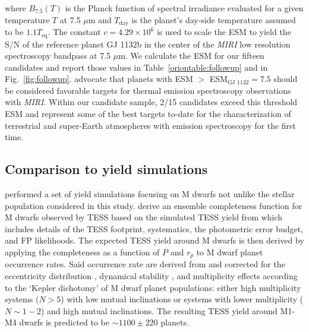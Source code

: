 \noindent where $B_{7.5}(T)$ is the Planck function of spectral irradiance evaluated for a given temperature
$T$ at 7.5 $\mu$m and $T_{\text{day}}$ is the planet's day-side temperature assumed to be $1.1T_{\text{eq}}$.
The constant $c=4.29\times 10^6$ is used to scale the ESM to yield the S/N of the reference planet GJ 1132b
\citep{berta15,dittmann17b} in the center of the \emph{MIRI} low resolution spectroscopy bandpass at 7.5 $\mu$m. 
We calculate the ESM for our fifteen candidates and report those values in Table~\ref{oriontable:followup} and in
Fig.~\ref{fig:followup}. \cite{kempton18} advocate that planets with ESM $>$ ESM$_{\text{GJ 1132}}=7.5$ should
be considered favorable targets for thermal emission spectroscopy observations with \emph{MIRI}. Within our
candidate sample, 2/15 candidates exceed this threshold ESM and represent some of the best targets to-date for
the characterization of terrestrial and super-Earth atmospheres with emission spectroscopy for the first time.


\subsection{Comparison to yield simulations}
\cite{ballard18} performed a set of yield simulations focusing on M dwarfs not unlike the
stellar population considered in this study. \cite{ballard18} derive an ensemble completeness
function for M dwarfs observed by TESS based on the simulated TESS yield
from \cite{sullivan15} which includes details of the TESS footprint, systematics, the
photometric error budget, and FP likelihoods. The expected TESS yield around M dwarfs is
then derived by applying the completeness as a function of $P$ and $r_p$ to M dwarf planet
occurrence rates. Said occurrence rate are
derived from \cite{dressing15a} and corrected for the eccentricity
distribution \citep{limbach15}, dynamical stability \citep{fabrycky12}, and multiplicity
effects according to the `Kepler dichotomy' \citep{ballard16} of M dwarf planet populations:
either high multiplicity systems ($N>5$) with low mutual inclinations or systems with lower
multiplicity ($N\sim 1-2$) and high mutual inclinations. The resulting TESS yield
around M1-M4 dwarfs is predicted to be $\sim 1100 \pm 220$ planets. \\


